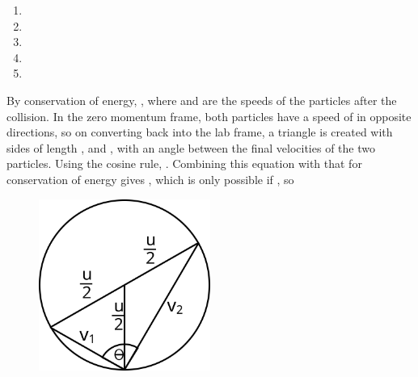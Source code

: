
\begin{problem} 
{ 
\begin{enumerate}
	\item {}
	\item {}
	\item {}
	\item {} \correct
	\item {}
\end{enumerate}
}
{}
{ By conservation of energy, , where  and  are the speeds of the particles after the collision. In the zero momentum frame, both particles have a speed of  in opposite directions, so on converting back into the lab frame, a triangle is created with sides of length ,  and  , with an angle \vari{\theta} between the final velocities of the two particles. Using the cosine rule, . Combining this equation with that for conservation of energy gives , which is only possible if , so 

\begin{figure}[h]
	\centering
	\includegraphics[width=0.5\textwidth]{../../../figures/dynamics_angle_between_identical_masses.svg}
	\caption{}\label{fig:Dynamics_angle_between_identical_masses}
\end{figure}
}
\end{problem}